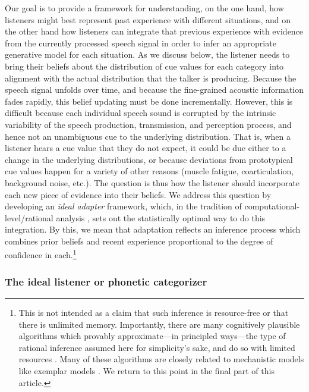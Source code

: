 Our goal is to provide a framework for understanding, on the one hand, how listeners might best represent past experience with different situations, and on the other hand how listeners can integrate that previous experience with evidence from the currently processed speech signal in order to infer an appropriate generative model for each situation.  As we discuss below, the listener needs to bring their beliefs about the distribution of cue values for each category into alignment with the actual distribution that the talker is producing.  Because the speech signal unfolds over time, and because the fine-grained acoustic information fades rapidly, this belief updating must be done incrementally. However, this is difficult because each individual speech sound is corrupted by the intrinsic variability
of the speech production, transmission, and perception process, and hence not an unambiguous cue to the underlying distribution.  That is, when a listener hears a cue value that they do not expect, it could be due either to a change in the underlying distributions,
or because deviations from prototypical cue values happen for a variety of other reasons (muscle fatigue, coarticulation, background noise, etc.).  The question is thus how the listener should incorporate each new piece of evidence into their beliefs.  We address this question by developing an \emph{ideal adapter} framework, which, in the tradition of computational-level/rational analysis \autocite{Anderson1990,Marr1982}, sets out the statistically optimal way to do this integration. By this, we mean that adaptation reflects an inference process which combines prior beliefs and recent experience proportional to the degree of confidence in each.\footnote{This is not intended as a claim that such inference is resource-free or that there is unlimited memory. Importantly, there are many cognitively plausible algorithms which provably approximate---in principled ways---the type of rational inference assumed here for simplicity's sake, and do so with limited resources \autocite[e.g.,][]{Sanborn2010}. Many of these algorithms are closely related to mechanistic models like exemplar models \protect\autocite[see][]{Gibson2013,Shi2010}. We return to this point in the final part of this article.}


\subsubsection{The ideal listener or phonetic categorizer}
\label{sec:ideal-phon-categ}

